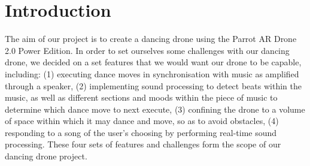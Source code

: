 \section{Introduction}

The aim of our project is to create a dancing drone using the Parrot AR Drone 2.0 Power Edition. In order to set ourselves some challenges with our dancing drone, we decided on a set features that we would want our drone to be capable, including: (1) executing dance moves in synchronisation with music as amplified through a speaker, (2) implementing sound processing to detect beats within the music, as well as different sections and moods within the piece of music to determine which dance move to next execute, (3) confining the drone to a volume of space within which it may dance and move, so as to avoid obstacles, (4) responding to a song of the user's choosing by performing real-time sound processing. These four sets of features and challenges form the scope of our dancing drone project.